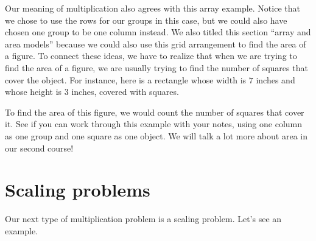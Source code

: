 \documentclass{ximera}
\begin{document}
Our meaning of multiplication also agrees with this array example. Notice that we chose to use the rows for our groups in this case, but we could also have chosen one group to be one column instead. We also titled this section ``array and area models'' because we could also use this grid arrangement to find the area of a figure. To connect these ideas, we have to realize that when we are trying to find the area of a figure, we are usually trying to find the number of squares that cover the object. For instance, here is a rectangle whose width is $7$ inches and whose height is $3$ inches, covered with squares.
\begin{image}
\end{image}
To find the area of this figure, we would count the number of squares that cover it. See if you can work through this example with your notes, using one column as one group and one square as one object. We will talk a lot more about area in our second course!





\section{Scaling problems}

Our next type of multiplication problem is a scaling problem. Let's see an example.
\end{document}

